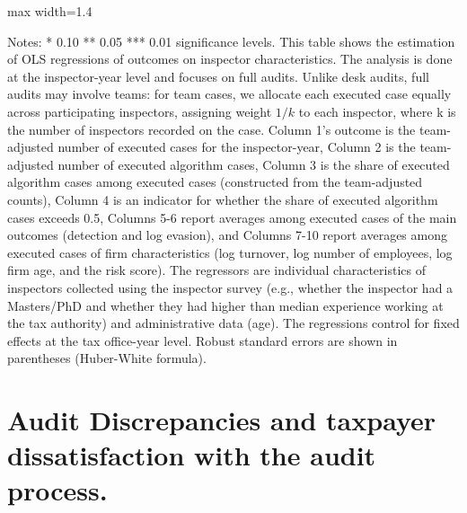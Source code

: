 \documentclass{article}
\newcommand{\OutPath}{Output/}%
\newcommand{\OutPath}{../Output/}%
\newcommand{\sym}[1]{\ifmmode^{#1}\else\(^{#1}\)\fi}
\begin{document}
\begin{landscape}
\begin{table}[!htbp]\centering
\begin{adjustbox}{max width=1.4\textwidth}
\begin{threeparttable}
\caption{Inspector Characteristics and Performance, Full Audits [Executed]}
\label{tab:inspector_effort_disc_Desk}



\begin{tablenotes}[flushleft]
\footnotesize \item Notes: * 0.10 ** 0.05 *** 0.01 significance levels. This table shows the estimation of OLS regressions of outcomes on inspector characteristics. The analysis is done at the inspector-year level and focuses on full audits. Unlike desk audits, full audits may involve teams: for team cases, we allocate each executed case equally across participating inspectors, assigning weight $1/k$ to each inspector, where k is the number of inspectors recorded on the case. Column 1's outcome is the team-adjusted number of executed cases for the inspector-year, Column 2 is the team-adjusted number of executed algorithm cases, Column 3 is the share of executed algorithm cases among executed cases (constructed from the team-adjusted counts), Column 4 is an indicator for whether the share of executed algorithm cases exceeds 0.5, Columns 5-6 report averages among executed cases of the main outcomes (detection and log evasion), and Columns 7-10 report averages among executed cases of firm characteristics (log turnover, log number of employees, log firm age, and the risk score). The regressors are individual characteristics of inspectors collected using the inspector survey (e.g., whether the inspector had a Masters/PhD and whether they had higher than median experience working at the tax authority) and administrative data (age). The regressions control for fixed effects at the tax office-year level. Robust standard errors are shown in parentheses (Huber-White formula).
\end{tablenotes}
\end{threeparttable}
\end{adjustbox}
\end{table}
\end{landscape}

\section{Audit Discrepancies and taxpayer dissatisfaction with the audit process.}
\label{sec:audit_discrepancy_taxpayer}
\providecommand{\sym}[1]{\ifmmode^{#1}\else\(^{#1}\)\fi}
\end{document}
